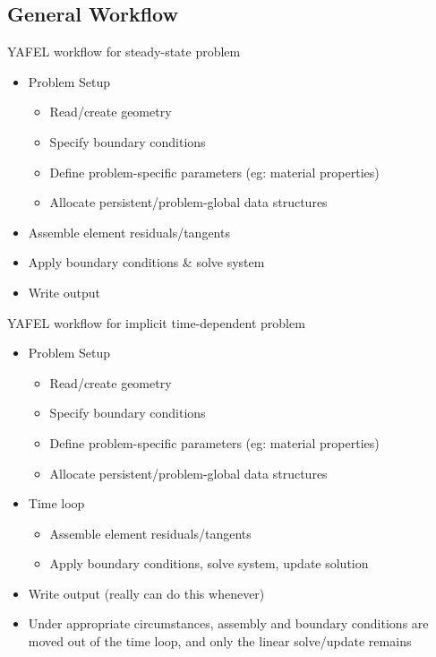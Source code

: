 

\subsection{General Workflow}
\begin{frame}{YAFEL workflow for steady-state problem}
  \begin{itemize}
  \item
    Problem Setup
    \begin{itemize}
    \item Read/create geometry
    \item Specify boundary conditions
    \item Define problem-specific parameters (eg: material properties)
    \item Allocate persistent/problem-global data structures
    \end{itemize}
  \item
    Assemble element residuals/tangents
  \item
    Apply boundary conditions \& solve system
  \item
    Write output
  \end{itemize}
\end{frame}

\begin{frame}{YAFEL workflow for implicit time-dependent problem}
  \begin{itemize}
  \item
    Problem Setup
    \begin{itemize}
    \item Read/create geometry
    \item Specify boundary conditions
    \item Define problem-specific parameters (eg: material properties)
    \item Allocate persistent/problem-global data structures
    \end{itemize}
  \item
    Time loop
    \begin{itemize}
    \item
      Assemble element residuals/tangents
    \item
      Apply boundary conditions, solve system, update solution
    \end{itemize}
  \item
    Write output (really can do this whenever)
  \item
    Under appropriate circumstances, assembly and boundary conditions
    are moved out of the time loop, and only the linear solve/update remains
  \end{itemize}
\end{frame}

